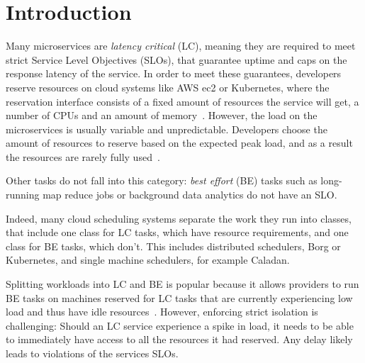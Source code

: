 \section{Introduction}
\label{s:intro}

Many microservices are \textit{latency critical} (LC), meaning they are required
to meet strict Service Level Objectives (SLOs), that guarantee uptime and caps
on the response latency of the service. In order to meet these guarantees,
developers reserve resources on cloud systems like AWS ec2 or Kubernetes, where
the reservation interface consists of a fixed amount of resources the service
will get, \ie{} a number of CPUs and an amount of
memory~\cite{aws-ec2-resources, kubernetes-resources}. However, the load on the
microservices is usually variable and unpredictable. Developers choose the
amount of resources to reserve based on the expected peak load, and as a result
the resources are rarely fully used~\cite{borg, nu, overprovision}.

Other tasks do not fall into this category: \textit{best effort} (BE) tasks such
as long-running map reduce jobs or background data analytics do not have an SLO.

Indeed, many cloud scheduling systems separate the work they run into classes,
that include one class for LC tasks, which have resource requirements, and one
class for BE tasks, which don't. This includes distributed schedulers, \eg{}
Borg\cite{borg} or Kubernetes\cite{kubernetes-resources}, and single machine
schedulers, for example Caladan\cite{caladan}.

Splitting workloads into LC and BE is popular because it allows providers to run
BE tasks on machines reserved for LC tasks that are currently experiencing low
load and thus have idle resources~\cite{perfiso}. However, enforcing strict
isolation is challenging: Should an LC service experience a spike in load, it
needs to be able to immediately have access to all the resources it had
reserved. Any delay likely leads to violations of the services SLOs.

